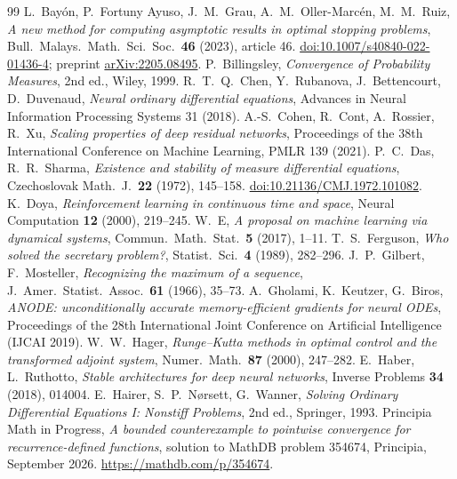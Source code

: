 \documentclass[11pt]{article}
\theoremstyle{definition}
\theoremstyle{remark}
\newcommand{\1}{\mathbf{1}}
\begin{document}
\begin{thebibliography}{99}\small
{} L.~Bay\'on, P.~Fortuny Ayuso, J.~M.~Grau, A.~M.~Oller-Marc\'en, M.~M.~Ruiz,
\emph{A new method for computing asymptotic results in optimal stopping problems},
Bull.\ Malays.\ Math.\ Sci.\ Soc.\ \textbf{46} (2023), article 46.
\href{https://doi.org/10.1007/s40840-022-01436-4}{doi:10.1007/s40840-022-01436-4};
preprint \href{https://arxiv.org/abs/2205.08495}{arXiv:2205.08495}.
 P.~Billingsley, \emph{Convergence of Probability Measures}, 2nd ed., Wiley, 1999.
 R.~T.~Q.~Chen, Y.~Rubanova, J.~Bettencourt, D.~Duvenaud, \emph{Neural ordinary
differential equations}, Advances in Neural Information Processing Systems 31 (2018).
 A.-S.~Cohen, R.~Cont, A.~Rossier, R.~Xu, \emph{Scaling properties of deep residual
networks}, Proceedings of the 38th International Conference on Machine Learning, PMLR 139 (2021).
 P.~C.~Das, R.~R.~Sharma, \emph{Existence and stability of measure differential
equations}, Czechoslovak Math.\ J.\ \textbf{22} (1972), 145--158.
\href{https://doi.org/10.21136/CMJ.1972.101082}{doi:10.21136/CMJ.1972.101082}.
 K.~Doya, \emph{Reinforcement learning in continuous time and space},
Neural Computation \textbf{12} (2000), 219--245.
 W.~E, \emph{A proposal on machine learning via dynamical systems},
Commun.\ Math.\ Stat.\ \textbf{5} (2017), 1--11.
 T.~S.~Ferguson, \emph{Who solved the secretary problem?}, Statist.\ Sci.\
\textbf{4} (1989), 282--296.
 J.~P.~Gilbert, F.~Mosteller, \emph{Recognizing the maximum of a sequence},
J.\ Amer.\ Statist.\ Assoc.\ \textbf{61} (1966), 35--73.
 A.~Gholami, K.~Keutzer, G.~Biros, \emph{ANODE: unconditionally accurate memory-efficient
gradients for neural ODEs}, Proceedings of the 28th International Joint Conference on Artificial
Intelligence (IJCAI 2019).
 W.~W.~Hager, \emph{Runge--Kutta methods in optimal control and the transformed adjoint
system}, Numer.\ Math.\ \textbf{87} (2000), 247--282.
 E.~Haber, L.~Ruthotto, \emph{Stable architectures for deep neural networks},
Inverse Problems \textbf{34} (2018), 014004.
 E.~Hairer, S.~P.~N{\o}rsett, G.~Wanner, \emph{Solving Ordinary Differential
Equations I: Nonstiff Problems}, 2nd ed., Springer, 1993.
 Principia Math in Progress, \emph{A bounded counterexample to pointwise convergence
for recurrence-defined functions}, solution to MathDB problem 354674, Principia, September 2026.
\url{https://mathdb.com/p/354674}.

\end{thebibliography}
\end{document}
